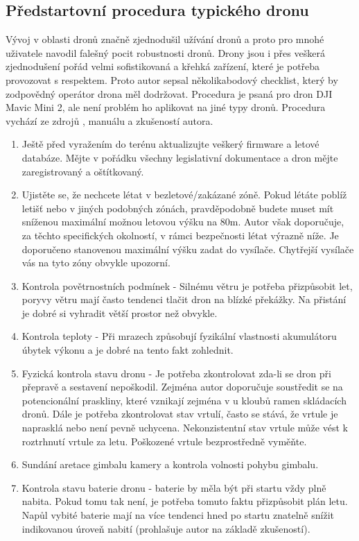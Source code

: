 \subsection{Předstartovní procedura typického dronu}
Vývoj v oblasti dronů značně zjednodušil užívání dronů a proto pro mnohé uživatele navodil falešný pocit robustnosti dronů. Drony jsou i přes veškerá zjednodušení pořád velmi sofistikovaná a křehká zařízení, které je potřeba provozovat s respektem. Proto autor sepsal několikabodový checklist, který by zodpovědný operátor drona měl dodržovat.  Procedura je psaná pro dron DJI Mavic Mini 2, ale není problém ho aplikovat na jiné typy dronů. Procedura vychází ze zdrojů \cite{PreflightChecklistPdf,PreflightChecklistSaftyCulture}, manuálu \cite{PreflightChecklistDJI} a zkušeností autora. 
\begin{enumerate}
    \item Ještě před vyražením do terénu aktualizujte veškerý firmware a letové databáze. Mějte v pořádku všechny legislativní dokumentace a dron mějte zaregistrovaný a oštítkovaný.
    \item Ujistěte se, že nechcete létat v bezletové/zakázané zóně. Pokud létáte poblíž letišť nebo v jiných podobných zónách, pravděpodobně budete muset mít sníženou maximální možnou letovou výšku na 80m. Autor však doporučuje, za těchto specifických okolností, v rámci bezpečnosti létat výrazně níže. Je doporučeno stanovenou maximální výšku zadat do vysílače. Chytřejší vysílače vás na tyto zóny obvykle upozorní. 
    \item Kontrola povětrnostních podmínek - Silnému větru je potřeba přizpůsobit let, poryvy větru mají často tendenci tlačit dron na blízké překážky. Na přistání je dobré si vyhradit větší prostor než obvykle.
    \item Kontrola teploty - Při mrazech způsobují fyzikální vlastnosti akumulátoru úbytek výkonu a je dobré na tento fakt zohlednit.
    \item Fyzická kontrola stavu dronu - Je potřeba zkontrolovat zda-li se dron při přepravě a sestavení nepoškodil. Zejména autor doporučuje soustředit se na potencionální praskliny, které vznikají zejména v u kloubů ramen skládacích dronů. Dále je potřeba zkontrolovat stav vrtulí, často se stává, že vrtule je naprasklá nebo není pevně uchycena. Nekonzistentní stav vrtule může vést k roztrhnutí vrtule za letu. Poškozené vrtule bezprostředně vyměňte.
    \item Sundání aretace gimbalu kamery a kontrola volnosti pohybu gimbalu.
    \item Kontrola stavu baterie dronu - baterie by měla být při startu vždy plně nabita. Pokud tomu tak není, je potřeba tomuto faktu přizpůsobit plán letu. Napůl vybité baterie mají na více tendenci hned po startu znatelně snížit indikovanou úroveň nabití (prohlašuje autor na základě zkušeností).

\end{enumerate}
